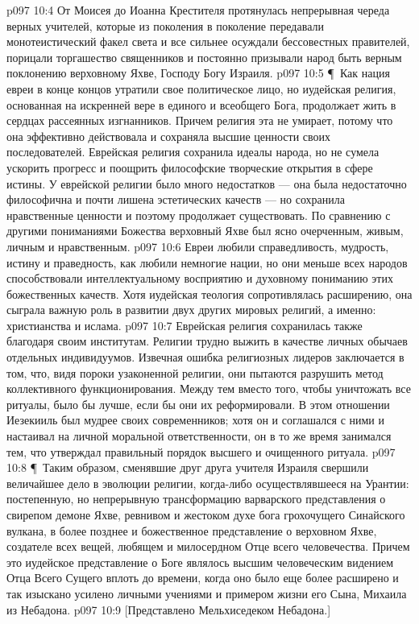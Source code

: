 \vs p097 10:4 От Моисея до Иоанна Крестителя протянулась непрерывная череда верных учителей, которые из поколения в поколение передавали монотеистический факел света и все сильнее осуждали бессовестных правителей, порицали торгашество священников и постоянно призывали народ быть верным поклонению верховному Яхве, Господу Богу Израиля.
\vs p097 10:5 \P\ Как нация евреи в конце концов утратили свое политическое лицо, но иудейская религия, основанная на искренней вере в единого и всеобщего Бога, продолжает жить в сердцах рассеянных изгнанников. Причем религия эта не умирает, потому что она эффективно действовала и сохраняла высшие ценности своих последователей. Еврейская религия сохранила идеалы народа, но не сумела ускорить прогресс и поощрить философские творческие открытия в сфере истины. У еврейской религии было много недостатков --- она была недостаточно философична и почти лишена эстетических качеств --- но сохранила нравственные ценности и поэтому продолжает существовать. По сравнению с другими пониманиями Божества верховный Яхве был ясно очерченным, живым, личным и нравственным.
\vs p097 10:6 Евреи любили справедливость, мудрость, истину и праведность, как любили немногие нации, но они меньше всех народов способствовали интеллектуальному восприятию и духовному пониманию этих божественных качеств. Хотя иудейская теология сопротивлялась расширению, она сыграла важную роль в развитии двух других мировых религий, а именно: христианства и ислама.
\vs p097 10:7 Еврейская религия сохранилась также благодаря своим институтам. Религии трудно выжить в качестве личных обычаев отдельных индивидуумов. Извечная ошибка религиозных лидеров заключается в том, что, видя пороки узаконенной религии, они пытаются разрушить метод коллективного функционирования. Между тем вместо того, чтобы уничтожать все ритуалы, было бы лучше, если бы они их реформировали. В этом отношении Иезекииль был мудрее своих современников; хотя он и соглашался с ними и настаивал на личной моральной ответственности, он в то же время занимался тем, что утверждал правильный порядок высшего и очищенного ритуала.
\vs p097 10:8 \P\ Таким образом, сменявшие друг друга учителя Израиля свершили величайшее дело в эволюции религии, когда\hyp{}либо осуществлявшееся на Урантии: постепенную, но непрерывную трансформацию варварского представления о свирепом демоне Яхве, ревнивом и жестоком духе бога грохочущего Синайского вулкана, в более позднее и божественное представление о верховном Яхве, создателе всех вещей, любящем и милосердном Отце всего человечества. Причем это иудейское представление о Боге являлось высшим человеческим видением Отца Всего Сущего вплоть до времени, когда оно было еще более расширено и так изыскано усилено личными учениями и примером жизни его Сына, Михаила из Небадона.
\vs p097 10:9 [Представлено Мельхиседеком Небадона.]
